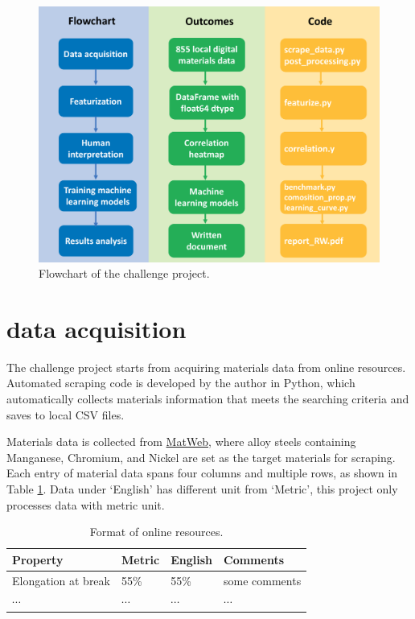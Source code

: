 \documentclass[10pt,aps,prb,amsmath,amssymb,twocolumn,letterpaper,nobalancelastpage,final,citeautoscript,floatfix,raggedbottom,superscriptaddress]{revtex4-1}
\begin{document}
\begin{figure}[h]
  \center
  \vspace{-1mm}
 \includegraphics[width=0.95\linewidth]{figures/flowchart.png}
  \caption{Flowchart of the challenge project.}
  \label{fig:flowchart}
\end{figure}




\section{data acquisition}

The challenge project starts from acquiring materials data from online resources. Automated scraping code is developed by the author in Python, which automatically collects materials information that meets the searching criteria and saves to local CSV files. 

Materials data is collected from \href{http://www.matweb.com/index.aspx}{MatWeb}, where alloy steels containing Manganese, Chromium, and Nickel are set as the target materials for scraping. Each entry of material data spans four columns and multiple rows, as shown in Table \ref{tab:web_data}. Data under `English' has different unit from `Metric', this project only processes data with metric unit.

\vspace{-10pt}
\begin{table}[h]
\begin{ruledtabular}
\caption{Format of online resources.\label{tab:web_data}}\centering
\begin{tabular}{llll}
\sffamily Property & \sffamily Metric & \sffamily English &  \sffamily Comments \\
\hline 
Elongation at break & 55\% & 55\% & some comments \\
\hline
$\cdots$ & $\cdots$ & $\cdots$ & $\cdots$
\end{tabular}
\end{ruledtabular}
\end{table}
\end{document}
